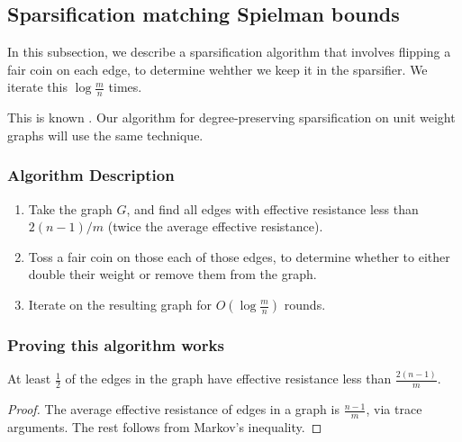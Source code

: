 


\subsection{Sparsification matching Spielman bounds}
In this subsection, we describe a sparsification algorithm that involves flipping a fair coin on each edge, to determine wehther we keep it in the sparsifier. We iterate this $\log \frac{m}{n}$ times.

This is known . Our algorithm for degree-preserving sparsification on unit weight graphs will use the same technique.

\subsubsection{Algorithm Description} \label{subsubsection:alg-desc}
\begin{enumerate} 
\item Take the graph $G$, and find all edges with effective resistance less than $2(n-1)/m$ (twice the average effective resistance).
\item Toss a fair coin on those each of those edges, to determine whether to either double
  their weight or remove them from the graph.
\item Iterate on the resulting graph for $O(\log \frac{m}{n})$ rounds.
\end{enumerate}
\subsubsection{Proving this algorithm works}
\begin{lemma} \label{lem:edge-keeps}
At least $\frac{1}{2}$ of the edges in the graph have effective resistance less than $\frac{2(n-1)}{m}$. \end{lemma}

\begin{proof} The average effective resistance of edges in a graph is $\frac{n-1}{m}$, via trace arguments. The rest follows from Markov's inequality. \end{proof}

